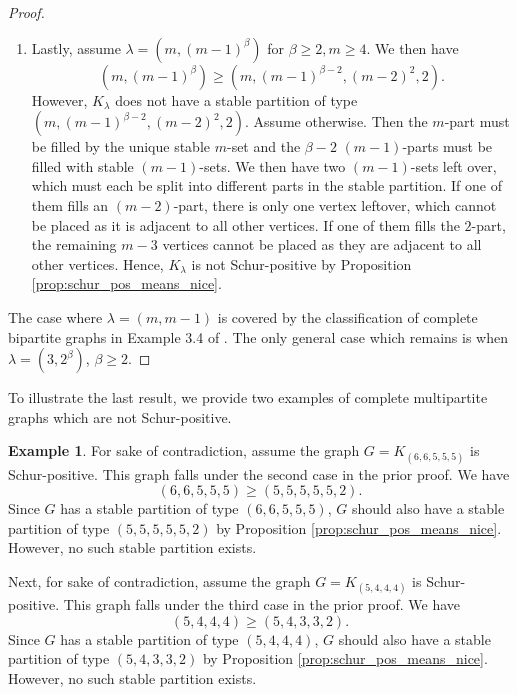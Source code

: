 \documentclass[12pt]{amsart}
\numberwithin{equation}{section}
\theoremstyle{plain}
\theoremstyle{definition}
\newtheorem{example}[equation]{Example}
\theoremstyle{remark}
\begin{document}
\begin{proof}
\begin{enumerate}
\item Lastly, assume $\lambda=(m,(m-1)^{\beta})$ for $\beta \ge 2, m\ge 4$. We then have
\[
(m,(m-1)^{\beta})\ge (m,(m-1)^{\beta-2},(m-2)^2,2).
\]
However, $K_{\lambda}$ does not have a stable partition of type $(m,(m-1)^{\beta-2},(m-2)^2,2)$. Assume otherwise. Then the $m$-part must be filled by the unique stable $m$-set and the $\beta-2$ $(m-1)$-parts must be filled with stable $(m-1)$-sets. We then have two $(m-1)$-sets left over, which must each be split into different parts in the stable partition. If one of them fills an $(m-2)$-part, there is only one vertex leftover, which cannot be placed  as it is adjacent to all other vertices. If one of them fills the $2$-part, the remaining $m-3$ vertices cannot be placed as they are adjacent to all other vertices. Hence, $K_{\lambda}$ is not Schur-positive by Proposition \ref{prop:schur_pos_means_nice}.



\end{enumerate}

The case where $\lambda=(m,m-1)$ is covered by the classification of complete bipartite graphs in Example 3.4 of \cite{WW2020}. The only general case which remains is when $\lambda=(3,2^{\beta})$, $\beta\ge 2$.
\end{proof}

To illustrate the last result, we provide two examples of complete multipartite graphs which are not Schur-positive. 
\begin{example}
For sake of contradiction, assume the graph $G=K_{(6,6,5,5,5)}$ is Schur-positive. This graph falls under the second case in the prior proof. We have
\[
(6,6,5,5,5)\ge (5,5,5,5,5,2).
\]
Since $G$ has a stable partition of type $(6,6,5,5,5)$, $G$ should also have a stable partition of type $(5,5,5,5,5,2)$ by Proposition \ref{prop:schur_pos_means_nice}. However, no such stable partition exists.


Next, for sake of contradiction, assume the graph $G=K_{(5,4,4,4)}$ is Schur-positive.
This graph falls under the third case in the prior proof. We have
\[
(5,4,4,4)\ge (5,4,3,3,2).
\]
Since $G$ has a stable partition of type $(5,4,4,4)$, $G$ should also have a stable partition of type $(5,4,3,3,2)$ by Proposition \ref{prop:schur_pos_means_nice}. However, no such stable partition exists.

\end{example}


\end{document}
